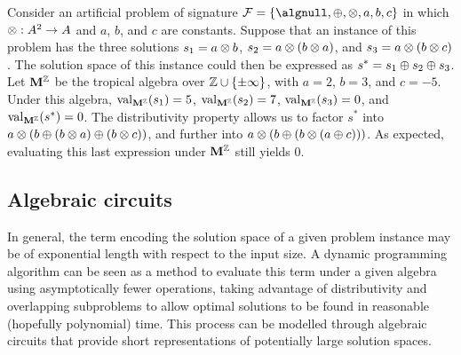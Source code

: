 \begin{example}\label{ex:abstract-problem}
    Consider an artificial problem of signature \(\algsign = \{\algnull, \algplus, \algtimes, a, b, c\}\) in which \(\mathbin{\otimes} : A^2 \rightarrow A\) and \(a\), \(b\), and \(c\) are constants.
    Suppose that an instance of this problem has the three solutions \(s_1 = a \mathbin{\otimes} b\), \(s_2 = a \mathbin{\otimes} (b \mathbin{\otimes} a)\), and \(s_3 = a \mathbin{\otimes} (b \mathbin{\otimes} c)\).
    The solution space of this instance could then be expressed as \(s^* = s_1 \mathbin{\oplus} s_2 \mathbin{\oplus} s_3\).
    Let \(\mathbf{M}^{\mathbb{Z}}\) be the tropical algebra over \(\mathbb{Z} \cup \{\pm\infty\}\), with \(a = 2\), \(b = 3\), and \(c = -5\).
    Under this algebra, \(\operatorname{val}_{\mathbf{M}^{\mathbb{Z}}}(s_1) = 5\), \(\operatorname{val}_{\mathbf{M}^{\mathbb{Z}}}(s_2) = 7\), \(\operatorname{val}_{\mathbf{M}^{\mathbb{Z}}}(s_3) = 0\), and \(\operatorname{val}_{\mathbf{M}^{\mathbb{Z}}}(s^*) = 0\).
    The distributivity property allows us to factor \(s^*\) into \(a \mathbin{\otimes} (b \mathbin{\oplus} (b \mathbin{\otimes} a) \mathbin{\oplus} (b \mathbin{\otimes} c))\), and further into \(a \mathbin{\otimes} (b \mathbin{\oplus} (b \mathbin{\otimes} (a \mathbin{\oplus} c)))\).
    As expected, evaluating this last expression under \(\mathbf{M}^{\mathbb{Z}}\) still yields \(0\).
\end{example}


\subsection{Algebraic circuits}

In general, the term encoding the solution space of a given problem instance may be of exponential length with respect to the input size.
A dynamic programming algorithm can be seen as a method to evaluate this term under a given algebra using asymptotically fewer operations, taking advantage of distributivity and overlapping subproblems to allow optimal solutions to be found in reasonable (hopefully polynomial) time.
This process can be modelled through algebraic circuits that provide short representations of potentially large solution spaces.

